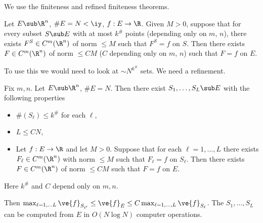 We use the finiteness and refined finiteness theorems.
\begin{thm}\label{thm:fin}
Let $E\sub \R^n$, $\#E=N<\iy$, $f:E\to \R$. Given $M>0$, suppose that for every subset $S\sub E$ with at most $k^\#$ points (depending only on $m$, $n$), there exists $F^S\in C^m(\R^n)$ of norm $\le M$ such that $F^S=f$ on $S$. Then there exists $F\in C^m(\R^n)$ of norm $\le C M$ ($C$ depending only on $m$, $n$) such that $F=f$ on $E$.
\end{thm}
To use this we would need to look at $\sim N^{k^\#}$ sets.  %
We need a refinement. 

\begin{thm}\label{thm:rft}
Fix $m,n$. Let $E\sub \R^n$, $\#E = N$. Then there exist $S_1,\ldots ,S_L\sub E$ with the following properties
\begin{itemize}
\item
$\#(S_\ell)\le k^\#$ for each $\ell$,
\item
$L\le CN$, 
\item
Let $f:E\to \R$ and let $M>0$. Suppose that for each $\ell=1,\ldots, L$ there exists $F_\ell\in C^m(\R^n)$ with norm $\le M$ such that $F_\ell=f$ on $S_\ell$. Then there exists $F\in C^m(\R^n)$ of norm $\le CM$ such that $F=f$ on $E$. 
\end{itemize}
Here $k^\#$ and $C$ depend only on $m,n$.

Then $\max_{\ell=1,\ldots L}\ve{f}_{S_{\ell'}}\le \ve{f}_E\le C \max_{\ell=1,\ldots, L} \ve{f}_{S_\ell}$. The $S_1,\ldots, S_L$ can be computed from $E$ in $O(N\log N)$ computer operations.
\end{thm}

